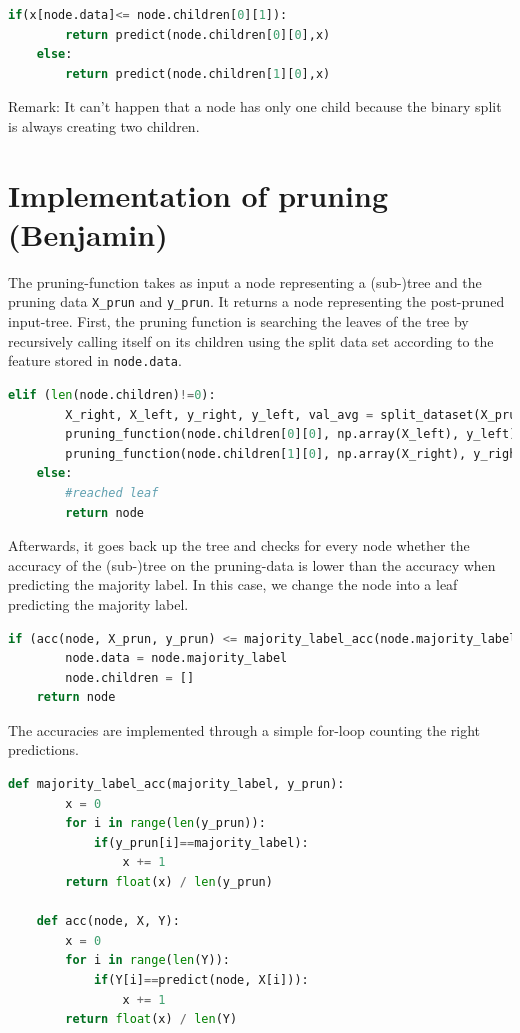 \documentclass[12pt,a4paper]{scrartcl}		%
\begin{document}
\begin{lstlisting}[language=Python]
    if(x[node.data]<= node.children[0][1]):
        return predict(node.children[0][0],x)  
    else:
        return predict(node.children[1][0],x) 
\end{lstlisting}

Remark: It can't happen that a node has only one child because the binary split is always 
creating two children.

\section{Implementation of pruning (Benjamin)}
The pruning-function takes as input a node representing a (sub-)tree and the pruning data \texttt{X\_prun} and \texttt{y\_prun}. 
It returns a node representing the post-pruned input-tree. 
First, the pruning function is searching the leaves of the tree by recursively calling itself on its children 
using the split data set according to the feature stored in \texttt{node.data}.

\begin{lstlisting}[language=Python]
    elif (len(node.children)!=0):
        X_right, X_left, y_right, y_left, val_avg = split_dataset(X_prun, y_prun, node.data)  
        pruning_function(node.children[0][0], np.array(X_left), y_left)
        pruning_function(node.children[1][0], np.array(X_right), y_right)
    else:
        #reached leaf
        return node
\end{lstlisting}

Afterwards, it goes back up the tree and checks for every node whether the accuracy of the (sub-)tree on the 
pruning-data is lower than the accuracy when predicting the majority label. 
In this case, we change the node into a leaf predicting the majority label. 

\begin{lstlisting}[language=Python]
    if (acc(node, X_prun, y_prun) <= majority_label_acc(node.majority_label, y_prun)):
        node.data = node.majority_label
        node.children = []
    return node
\end{lstlisting}

The accuracies are implemented through a simple for-loop counting the right predictions. 

\begin{lstlisting}[language=Python]
    def majority_label_acc(majority_label, y_prun):
        x = 0
        for i in range(len(y_prun)):
            if(y_prun[i]==majority_label):
                x += 1
        return float(x) / len(y_prun)

    def acc(node, X, Y):
        x = 0
        for i in range(len(Y)):
            if(Y[i]==predict(node, X[i])):
                x += 1
        return float(x) / len(Y)
\end{lstlisting}
\end{document}
